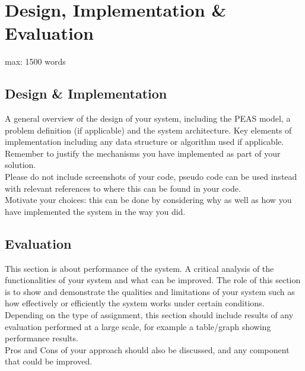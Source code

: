 \documentclass[letterpaper,12pt]{article}
\begin{document}

\section{Design, Implementation \& Evaluation}
\label{sec:design-implementation-evaluation}

max: 1500 words

\subsection{Design \& Implementation}

A general overview of the design of your system, including the PEAS model, a problem definition (if applicable) and the system architecture. Key elements of implementation including any data structure or algorithm used if applicable. Remember to justify the mechanisms you have implemented as part of your solution.\\

Please do not include screenshots of your code, pseudo code can be used instead with relevant references to where this can be found in your code.\\

Motivate your choices: this can be done by considering why as well as how you have implemented the system in the way you did.

\subsection{Evaluation}

This section is about performance of the system. A critical analysis of the functionalities of your system and what can be improved. The role of this section is to show and demonstrate the qualities and limitations of your system such as how effectively or efficiently the system works under certain conditions.\\

Depending on the type of assignment, this section should include results of any evaluation performed at a large scale, for example a table/graph showing performance results.\\

Pros and Cons of your approach should also be discussed, and any component that could be improved.\\

\end{document}
